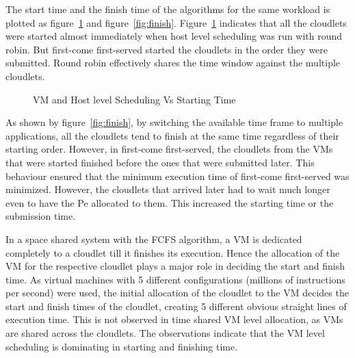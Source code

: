 \documentclass[times, 10pt,twocolumn]{article}
\begin{document}
The start time and the finish time of the algorithms for the same workload is plotted as figure~\ref{fig:start} and figure~\ref{fig:finish}. Figure~\ref{fig:start} indicates that all the cloudlets were started almost immediately when host level scheduling was run with round robin. But first-come first-served started the cloudlets in the order they were submitted. Round robin effectively shares the time window against the multiple cloudlets. 
\begin{figure}[ht]
 \caption{VM and Host level Scheduling Vs Starting Time}
 \label{fig:start}
\end{figure}

As shown by figure~\ref{fig:finish}, by switching the available time frame to multiple applications, all the cloudlets tend to finish at the same time regardless of their starting order. However, in first-come first-served, the cloudlets from the VMs that were started finished before the ones that were submitted later. This behaviour ensured that the minimum execution time of first-come first-served was minimized. However, the cloudlets that arrived later had to wait much longer even to have the Pe allocated to them. This increased the starting time or the submission time. 

In a space shared system with the FCFS algorithm, a VM is dedicated completely to a cloudlet till it finishes its execution. Hence the allocation of the VM for the respective cloudlet plays a major role in deciding the start and finish time. As virtual machines with 5 different configurations (millions of instructions per second) were used, the initial allocation of the cloudlet to the VM decides the start and finish times of the cloudlet, creating 5 different obvious straight lines of execution time. This is not observed in time shared VM level allocation, as VMs are shared across the cloudlets. The observations indicate that the VM level scheduling is dominating in starting and finishing time.
\end{document}
